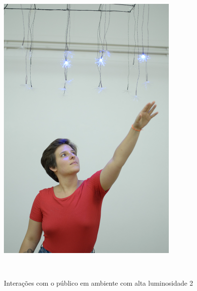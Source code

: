 \begin{apendicesenv}
\begin{figure}[H]
  \begin{center}
    \caption{Interações com o público em ambiente com alta luminosidade 2}
    \vspace*{0,2cm}
    \includegraphics[width=0.8\textwidth]{./04-figuras/instalacao_7}
    \label{fig:instalacao_7}
  \end{center}
  \vspace*{-0,9cm}
  \\
\end{figure}


\end{apendicesenv}

